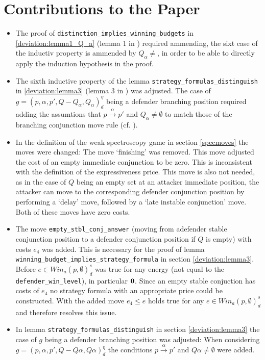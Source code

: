 \section{Contributions to the Paper}
\begin{itemize}
    \item The proof of \texttt{distinction\_implies\_winning\_budgets} in \ref{deviation:lemma1_Q_a} 
    (lemma 1 in \cite{bisping2023lineartimebranchingtime}) required ammending, the sixt case
    of the inductiv property is ammended by $Q_\alpha \neq {}$, in order to be able to directly
    apply the induction hypothesis in the proof.

    \item The sixth inductive property of the lemma \texttt{strategy\_formulas\_distinguish} in \ref{deviation:lemma3} 
    (lemma 3 in \cite{bisping2023lineartimebranchingtime}) was adjusted.
    The case of $g=(p,\alpha ,p', Q- Q_\alpha, Q_\alpha)_d^\eta$ being a defender branching position
    required adding the assumtions that $p \overset{\alpha}{\longrightarrow} p'$ and $Q_\alpha \neq \emptyset$
    to match those of the branching conjunction move rule (cf. \cite[p. 13]{bisping2023lineartimebranchingtime}). 

    \item In the definition of the weak spectroscopy game in section \ref{specmoves} the moves were changed: 
    The move `finishing' was removed. This move adjusted the cost of an empty immediate conjunction to be zero.
    This is inconsistent with the definition of the expressiveness price. This move is also not needed, as in the case of $Q$ being an empty set at an attacker immediate position, the attacker can move to the corresponding
    defender conjunction position by performing a `delay' move, followed by a `late instable conjunction' move. Both of these moves have zero costs.

    \item The move \texttt{empty\_stbl\_conj\_answer} (moving from adefender stable conjunction position to a defender conjunction
    position if $Q$ is empty) with costs $e_4$ was added. This is necessary for the proof of lemma 
    \texttt{winning\_budget\_implies\_strategy\_formula} in section \ref{deviation:lemma3}. Before 
    $e \in Win_a (p, \emptyset)_d^s $ was true for any energy (not equal to the \texttt{defender\_win\_level}), in particular $\bold{0}$. 
    Since an empty stable conjuction has costs of $e_4$ no strategy formula with an appropriate price could be constructed. 
    With the added move $e_4 \leq e $ holds true for any $e \in Win_a (p, \emptyset)_d^s $ and therefore resolves this issue.

    \item In lemma \texttt{strategy\_formulas\_distinguish} in section \ref{deviation:lemma3} the case of $g$ being a defender branching position was adjusted: 
    When considering $g=(p,\alpha ,p', Q- Q \alpha, Q \alpha)_d^\eta$ the conditions $p \overset{\alpha}{\longrightarrow} p'$ and $Q \alpha \neq \emptyset$ were added. 
\end{itemize}
